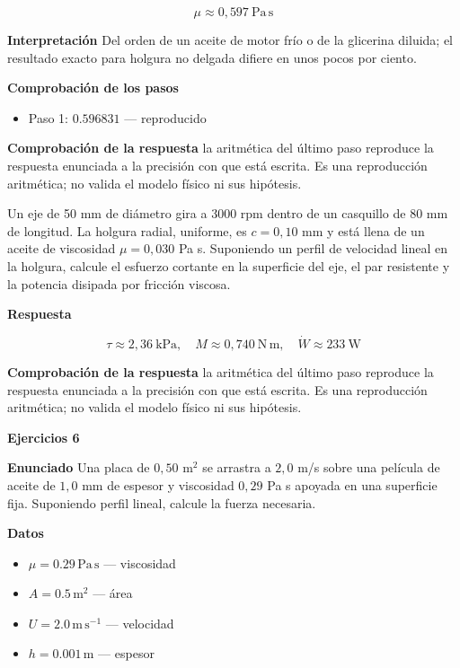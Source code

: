 \documentclass[10pt,openany]{book}
\begin{document}
\[
\mu \approx 0{,}597\ \mathrm{Pa\,s}
\]

\noindent\textbf{Interpretación}
Del orden de un aceite de motor frío o de la glicerina diluida; el resultado exacto para holgura no delgada difiere en unos pocos por ciento.

\noindent\textbf{Comprobación de los pasos}
\begin{itemize}
\item Paso 1: $0.596831$ — reproducido
\end{itemize}

\noindent\textbf{Comprobación de la respuesta} la aritmética del último paso reproduce la respuesta enunciada a la precisión con que está escrita. Es una reproducción aritmética; no valida el modelo físico ni sus hipótesis.

Un eje de 50 mm de diámetro gira a 3000 rpm dentro de un casquillo de 80 mm de longitud. La holgura radial, uniforme, es \(c = 0{,}10\) mm y está llena de un aceite de viscosidad \(\mu = 0{,}030\) Pa s. Suponiendo un perfil de velocidad lineal en la holgura, calcule el esfuerzo cortante en la superficie del eje, el par resistente y la potencia disipada por fricción viscosa.

\noindent\textbf{Respuesta}

\[
\tau \approx 2{,}36\ \mathrm{kPa},\quad M \approx 0{,}740\ \mathrm{N\,m},\quad \dot W \approx 233\ \mathrm{W}
\]

\noindent\textbf{Comprobación de la respuesta} la aritmética del último paso reproduce la respuesta enunciada a la precisión con que está escrita. Es una reproducción aritmética; no valida el modelo físico ni sus hipótesis.

\noindent\textbf{Ejercicios 6}

\noindent\textbf{Enunciado}
Una placa de \(0{,}50\) m\(^2\) se arrastra a \(2{,}0\) m/s sobre una película de aceite de \(1{,}0\) mm de espesor y viscosidad \(0{,}29\) Pa s apoyada en una superficie fija. Suponiendo perfil lineal, calcule la fuerza necesaria.

\noindent\textbf{Datos}
\begin{itemize}
\item $\mu = 0.29\,\mathrm{Pa}\,\mathrm{s}$ — viscosidad
\item $A = 0.5\,\mathrm{m}^{2}$ — área
\item $U = 2.0\,\mathrm{m}\,\mathrm{s}^{-1}$ — velocidad
\item $h = 0.001\,\mathrm{m}$ — espesor
\end{itemize}
\end{document}
